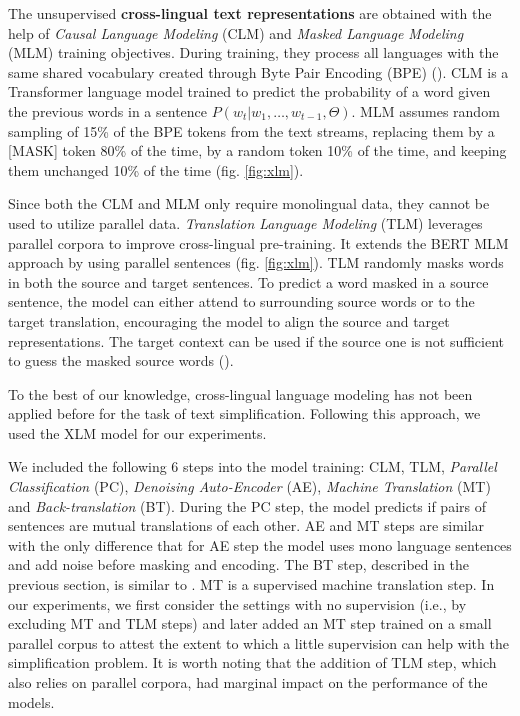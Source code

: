 The unsupervised \textbf{cross-lingual text representations} are obtained with the help of \emph{Causal Language Modeling} (CLM) and \emph{Masked Language Modeling} (MLM) training objectives. During training, they process all languages with the same shared vocabulary created through Byte Pair Encoding (BPE) (\cite{Sennrich2015NeuralMT}). CLM is a Transformer language model trained to predict the probability of a word given the previous words in a sentence $P(w_{t}|w_{1}, \dots, {w_{t-1}, \Theta})$. MLM assumes random sampling of 15\% of the BPE tokens from the text streams, replacing them by a [MASK] token 80\% of the time, by a random token 10\% of the time, and keeping them unchanged 10\% of the time (fig. \ref{fig:xlm}). 

Since both the CLM and MLM only require monolingual data, they cannot be used to utilize parallel data. \emph{Translation Language Modeling} (TLM) leverages parallel corpora to improve cross-lingual pre-training. It extends the BERT MLM approach by using parallel sentences (fig. \ref{fig:xlm}). TLM randomly masks words in both the source and target sentences. To predict a word masked in a source sentence, the model can either attend to surrounding source words or to the target translation, encouraging the model to align the source and target representations. The target context can be used if the source one is not sufficient to guess the masked source words (\cite{lample2019cross}).

To the best of our knowledge, cross-lingual language modeling has not been applied before for the task of text simplification. Following this approach, we used the XLM model for our experiments.

We included the following 6 steps into the model training: CLM, TLM, \emph{Parallel Classification} (PC), \emph{Denoising Auto-Encoder} (AE), \emph{Machine Translation} (MT) and \emph{Back-translation} (BT). During the PC step, the model predicts if pairs of sentences are mutual translations of each other. AE and MT steps are similar with the only difference that for AE step the model uses mono language sentences and add noise before masking and encoding. The BT step, described in the previous section, is similar to \cite{lample2018phrase}. MT is a supervised machine translation step. In our experiments, we first consider the settings with no supervision (i.e., by excluding MT and TLM steps) and later added an MT step trained on a small parallel corpus to attest the extent to which a little supervision can help with the simplification problem. It is worth noting that the addition of TLM step, which also relies on parallel corpora, had marginal impact on the performance of the models.   

